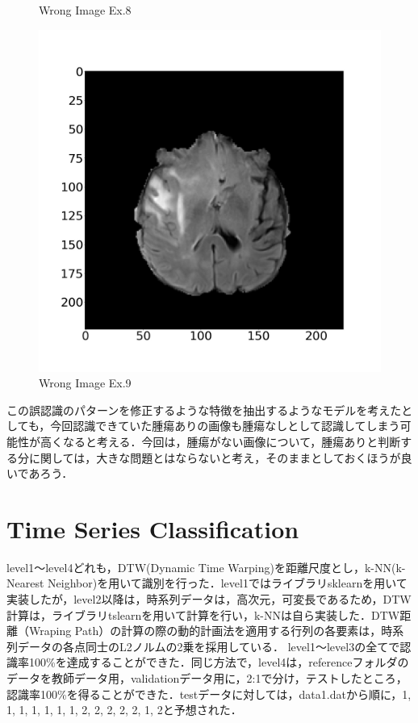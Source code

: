 \documentclass[11pt,a4j]{jarticle}
\begin{document}
\begin{figure}[ht]
\begin{minipage}{0.32\hsize}
		\vspace{-1cm}
		\renewcommand{\figurename}{Fig}
		\caption{Wrong Image Ex.8}
		\label{wp32}
	\end{minipage}
	\begin{minipage}{0.32\hsize}
		\centering
		\includegraphics[width=\linewidth]{../2_MedicalImageClassification/Dataset/106.jpg}
		\vspace{-1cm}
		\renewcommand{\figurename}{Fig}
		\caption{Wrong Image Ex.9}
		\label{wp33}
	\end{minipage}
\end{figure}

この誤認識のパターンを修正するような特徴を抽出するようなモデルを考えたとしても，今回認識できていた腫瘍ありの画像も腫瘍なしとして認識してしまう可能性が高くなると考える．今回は，腫瘍がない画像について，腫瘍ありと判断する分に関しては，大きな問題とはならないと考え，そのままとしておくほうが良いであろう．


\section{Time Series Classification}
level1～level4どれも，DTW(Dynamic Time Warping)を距離尺度とし，k-NN(k-Nearest Neighbor)を用いて識別を行った．level1ではライブラリsklearnを用いて実装したが，level2以降は，時系列データは，高次元，可変長であるため，DTW計算は，ライブラリtslearnを用いて計算を行い，k-NNは自ら実装した．DTW距離（Wraping Path）の計算の際の動的計画法を適用する行列の各要素は，時系列データの各点同士のL2ノルムの2乗を採用している．
level1～level3の全てで認識率100\%を達成することができた．同じ方法で，level4は，referenceフォルダのデータを教師データ用，validationデータ用に，2:1で分け，テストしたところ，認識率100\%を得ることができた．testデータに対しては，data1.datから順に，1, 1, 1, 1, 1, 1, 1, 2, 2, 2, 2, 2, 1, 2と予想された．
\end{document}
